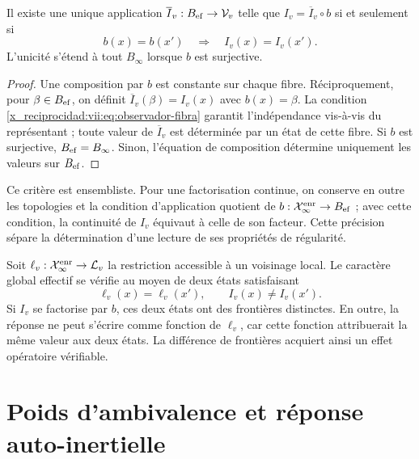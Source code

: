 \begin{theorem}
\label{x_reciprocidad:vii:thm:observador-factorizacion}
Il existe une unique application \(\overline I_v:B_{\rm ef}\to\mathcal V_v\)
telle que \(I_v=\overline I_v\circ b\) si et seulement si
\begin{equation}
 b(x)=b(x')\quad\Longrightarrow\quad I_v(x)=I_v(x').
 \label{x_reciprocidad:vii:eq:observador-fibra}
\end{equation}
L'unicité s'étend à tout \(B_\infty\) lorsque \(b\) est
surjective.
\end{theorem}

\begin{proof}
Une composition par \(b\) est constante sur chaque fibre. Réciproquement,
pour \(\beta\in B_{\rm ef}\), on définit
\(\overline I_v(\beta)=I_v(x)\) avec \(b(x)=\beta\).
La condition \eqref{x_reciprocidad:vii:eq:observador-fibra} garantit l'indépendance
vis-à-vis du représentant ; toute valeur de \(\overline I_v\) est déterminée
par un état de cette fibre. Si \(b\) est surjective,
\(B_{\rm ef}=B_\infty\). Sinon, l'équation de composition
détermine uniquement les valeurs sur \(B_{\rm ef}\).
\end{proof}

Ce critère est ensembliste. Pour une factorisation continue, on
conserve en outre les topologies et la condition d'application quotient
de \(b:\mathcal X_\infty^{\rm enr}\to B_{\rm ef}\) ; avec cette condition, la
continuité de \(I_v\) équivaut à celle de son facteur. Cette précision
sépare la détermination d'une lecture de ses propriétés de régularité.

Soit \(\ell_v:\mathcal X_\infty^{\rm enr}\to\mathcal L_v\) la restriction accessible à un voisinage local. Le caractère global effectif se vérifie au moyen de deux états satisfaisant
\begin{equation}
 \ell_v(x)=\ell_v(x'),\qquad I_v(x)\neq I_v(x').
 \label{x_reciprocidad:vii:eq:observador-testigo-global}
\end{equation}
Si \(I_v\) se factorise par \(b\), ces deux états ont des frontières
distinctes. En outre, la réponse ne peut s'écrire comme fonction de
\(\ell_v\), car cette fonction attribuerait la même valeur aux deux états.
La différence de frontières acquiert ainsi un effet opératoire vérifiable.

\section{Poids d'ambivalence et réponse auto-inertielle}
\label{x_reciprocidad:vii:sec:observador-ambivalencia}

